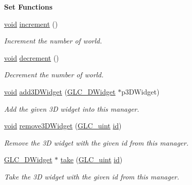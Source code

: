 \begin{Indent}{\bf Set Functions}\par
\begin{DoxyCompactItemize}
\item 
\hyperlink{group___u_a_v_objects_plugin_ga444cf2ff3f0ecbe028adce838d373f5c}{void} \hyperlink{class_g_l_c__3_d_widget_manager_handle_a3b1de294611f93bfe502007f92c9e55a}{increment} ()
\begin{DoxyCompactList}\small\item\em Increment the number of world. \end{DoxyCompactList}\item 
\hyperlink{group___u_a_v_objects_plugin_ga444cf2ff3f0ecbe028adce838d373f5c}{void} \hyperlink{class_g_l_c__3_d_widget_manager_handle_adb039f84118cb399a581e94c86a164f6}{decrement} ()
\begin{DoxyCompactList}\small\item\em Decrement the number of world. \end{DoxyCompactList}\item 
\hyperlink{group___u_a_v_objects_plugin_ga444cf2ff3f0ecbe028adce838d373f5c}{void} \hyperlink{class_g_l_c__3_d_widget_manager_handle_a235ee2dac1cbe62f37e37db2e4af9c82}{add3\-D\-Widget} (\hyperlink{class_g_l_c__3_d_widget}{G\-L\-C\-\_\-D\-Widget} $\ast$p3\-D\-Widget)
\begin{DoxyCompactList}\small\item\em Add the given 3\-D widget into this manager. \end{DoxyCompactList}\item 
\hyperlink{group___u_a_v_objects_plugin_ga444cf2ff3f0ecbe028adce838d373f5c}{void} \hyperlink{class_g_l_c__3_d_widget_manager_handle_a71ec9590a76136e7dbccbf8b688ede49}{remove3\-D\-Widget} (\hyperlink{glc__global_8h_abf950976fabed69026558df8e2da6c6b}{G\-L\-C\-\_\-uint} \hyperlink{glext_8h_a58c2a664503e14ffb8f21012aabff3e9}{id})
\begin{DoxyCompactList}\small\item\em Remove the 3\-D widget with the given id from this manager. \end{DoxyCompactList}\item 
\hyperlink{class_g_l_c__3_d_widget}{G\-L\-C\-\_\-D\-Widget} $\ast$ \hyperlink{class_g_l_c__3_d_widget_manager_handle_a064b01863f76f188ef6dcf7f0ac83a4d}{take} (\hyperlink{glc__global_8h_abf950976fabed69026558df8e2da6c6b}{G\-L\-C\-\_\-uint} \hyperlink{glext_8h_a58c2a664503e14ffb8f21012aabff3e9}{id})
\begin{DoxyCompactList}\small\item\em Take the 3\-D widget with the given id from this manager. \end{DoxyCompactList}\item 

\end{DoxyCompactItemize}
\end{Indent}
